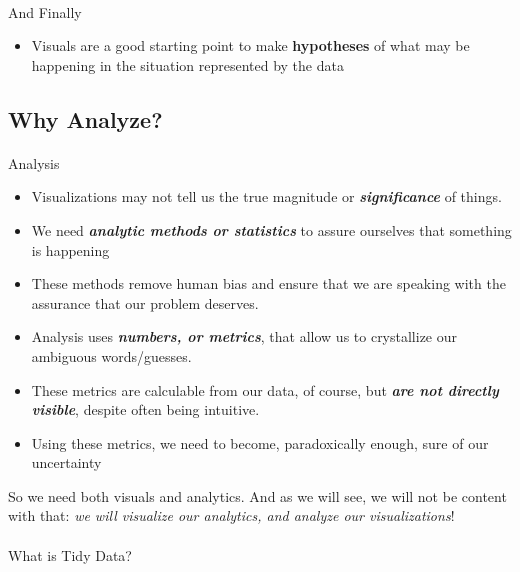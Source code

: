 \documentclass[
  letterpaper,
  DIV=11,
  numbers=noendperiod]{scrartcl}
\makeatletter
\let\oldparagraph\paragraph
\renewcommand{\paragraph}{
    \@ifstar
      \xxxParagraphStar
      \xxxParagraphNoStar
  }
\newcommand{\xxxParagraphStar}[1]{\oldparagraph*{#1}\mbox{}}
\newcommand{\xxxParagraphNoStar}[1]{\oldparagraph{#1}\mbox{}}
\providecommand{\tightlist}{%
  \setlength{\itemsep}{0pt}\setlength{\parskip}{0pt}}
\makeatother
\begin{document}
\paragraph{And Finally}\label{and-finally}

\begin{itemize}
\tightlist
\item
  Visuals are a good starting point {to make \textbf{hypotheses}} of
  what may be happening in the situation represented by the data
\end{itemize}

\subsection{\texorpdfstring{ Why
Analyze?}{ Why Analyze?}}\label{why-analyze}

\paragraph{Analysis}\label{analysis}

\begin{itemize}
\tightlist
\item
  Visualizations may not tell us the true magnitude or
  {\textbf{\emph{significance}} of things}.
\item
  We need \textbf{\emph{analytic methods or statistics}} to assure
  ourselves that something is happening
\item
  These methods remove human bias and ensure that we are speaking with
  the assurance that our problem deserves.
\item
  Analysis uses {\textbf{\emph{numbers, or metrics}}}, that allow us to
  crystallize our ambiguous words/guesses.
\item
  These metrics are calculable from our data, of course, but
  \textbf{\emph{are not directly visible}}, despite often being
  intuitive.
\item
  Using these metrics, we need to become, paradoxically enough, {sure of
  our uncertainty}
\end{itemize}

So we need both visuals and analytics. And as we will see, we will not
be content with that: \emph{we will visualize our analytics, and analyze
our visualizations}!

\paragraph{What is Tidy Data?}\label{what-is-tidy-data}
\end{document}
